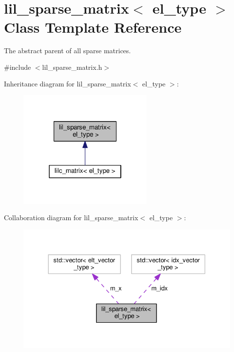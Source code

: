 \hypertarget{classlil__sparse__matrix}{}\section{lil\+\_\+sparse\+\_\+matrix$<$ el\+\_\+type $>$ Class Template Reference}
\label{classlil__sparse__matrix}


The abstract parent of all sparse matrices.  




{\ttfamily \#include $<$lil\+\_\+sparse\+\_\+matrix.\+h$>$}



Inheritance diagram for lil\+\_\+sparse\+\_\+matrix$<$ el\+\_\+type $>$\+:\nopagebreak
\begin{figure}[H]
\begin{center}
\leavevmode
\includegraphics[width=190pt]{classlil__sparse__matrix__inherit__graph}
\end{center}
\end{figure}


Collaboration diagram for lil\+\_\+sparse\+\_\+matrix$<$ el\+\_\+type $>$\+:\nopagebreak
\begin{figure}[H]
\begin{center}
\leavevmode
\includegraphics[width=330pt]{classlil__sparse__matrix__coll__graph}
\end{center}
\end{figure}

